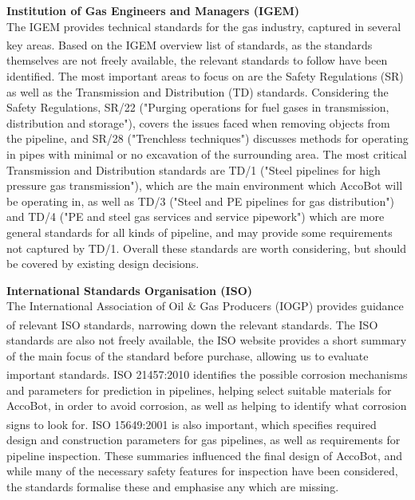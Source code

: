 \documentclass[11pt]{article}		%
\newcommand{\supercite}[1]{\textsuperscript{\cite{#1}}}		%
\begin{document}
			\textbf{Institution of Gas Engineers and Managers (IGEM)}
			\\
			The IGEM provides technical standards for the gas industry, captured in several key areas.
			Based on the IGEM overview list of standards\supercite{institution2021igem}, as the standards themselves are not freely available, the relevant standards to follow have been identified.
			The most important areas to focus on are the Safety Regulations (SR) as well as the Transmission and Distribution (TD) standards.
			Considering the Safety Regulations, SR/22 ("Purging operations for fuel gases in transmission, distribution and storage"), covers the issues faced when removing objects from the pipeline, and SR/28 ("Trenchless techniques") discusses methods for operating in pipes with minimal or no excavation of the surrounding area.
			The most critical Transmission and Distribution standards are TD/1 ("Steel pipelines for high pressure gas transmission"), which are the main environment which AccoBot will be operating in, as well as TD/3 ("Steel and PE pipelines for gas distribution") and TD/4 ("PE and steel gas services and service pipework") which are more general standards for all kinds of pipeline, and may provide some requirements not captured by TD/1.
			Overall these standards are worth considering, but should be covered by existing design decisions.
			
			\textbf{International Standards Organisation (ISO)}
			\\
			The International Association of Oil \& Gas Producers (IOGP) provides guidance of relevant ISO standards\supercite{iogp2017standards}, narrowing down the relevant standards.
			The ISO standards are also not freely available, the ISO website provides a short summary of the main focus of the standard before purchase, allowing us to evaluate important standards.
			ISO 21457:2010\supercite{iso21457} identifies the possible corrosion mechanisms and parameters for prediction in pipelines, helping select suitable materials for AccoBot, in order to avoid corrosion, as well as helping to identify what corrosion signs to look for.
			ISO 15649:2001\supercite{iso15649} is also important, which specifies required design and construction parameters for gas pipelines, as well as requirements for pipeline inspection.
			These summaries influenced the final design of AccoBot, and while many of the necessary safety features for inspection have been considered, the standards formalise these and emphasise any which are missing.
		    
\end{document}
